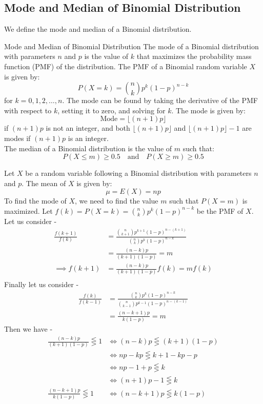\documentclass[openany]{book}
\begin{document}
\subsection{Mode and Median of Binomial Distribution}
We define the mode and median of a Binomial distribution.
\begin{mydefinition}{Mode and Median of Binomial Distribution}
    The mode of a Binomial distribution with parameters $n$ and $p$ is the value of $k$ that maximizes the probability mass function (PMF) of the distribution. The PMF of a Binomial random variable $X$ is given by:
    $$P(X = k) = \binom{n}{k} p^k (1 - p)^{n - k}$$
    for $k = 0, 1, 2, \ldots, n$. The mode can be found by taking the derivative of the PMF with respect to $k$, setting it to zero, and solving for $k$. The mode is given by:
    $$\text{Mode} = \lfloor (n + 1)p \rfloor$$
    if $(n + 1)p$ is not an integer, and both $\lfloor (n + 1)p \rfloor$ and $\lfloor (n + 1)p \rfloor - 1$ are modes if $(n + 1)p$ is an integer. \\
    The median of a Binomial distribution is the value of $m$ such that:
    $$P(X \leq m) \geq 0.5 \quad \text{and} \quad P(X \geq m) \geq 0.5$$
\end{mydefinition}
Let $X$ be a random variable following a Binomial distribution with parameters $n$ and $p$. The mean of $X$ is given by:
$$\mu = E(X) = np$$
To find the mode of $X$, we need to find the value $m$ such that $P(X = m)$ is maximized.
Let $f(k) = P(X = k) = \binom{n}{k} p^k (1 - p)^{n - k}$ be the PMF of $X$. Let us consider - 
\begin{align*}
    \frac{f(k+1)}{f(k)} &= \frac{\binom{n}{k+1} p^{k+1} (1 - p)^{n - (k + 1)}}{\binom{n}{k} p^k (1 - p)^{n - k}} \\
    &= \frac{(n-k)p}{(k+1)(1-p)} = m \\
    \implies f(k+1) &= \frac{(n-k)p}{(k+1)(1-p)}f(k) = mf(k) \\ 
\end{align*}
Finally let us consider - 
\begin{align*}
    \frac{f(k)}{f(k-1)} &= \frac{\binom{n}{k} p^k (1 - p)^{n - k}}{\binom{n}{k-1} p^{k-1} (1 - p)^{n - (k - 1)}} \\
    &= \frac{(n-k+1)p}{k(1-p)} = m
\end{align*}
Then we have - 
\begin{align*}
    \frac{(n-k)p}{(k+1)(1-p)} \lesseqgtr 1 &\iff (n-k)p \lesseqgtr (k+1)(1-p) \\
    &\iff np - kp \lesseqgtr k + 1 - kp - p \\
    &\iff np - 1 + p \lesseqgtr k \\
    &\iff (n+1)p - 1 \lesseqgtr k \\
    \frac{(n-k+1)p}{k(1-p)} \lesseqgtr 1 &\iff (n-k+1)p \lesseqgtr k(1-p) \\
\end{align*}
\end{document}
